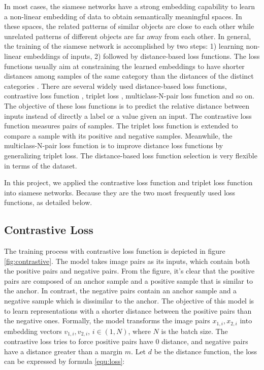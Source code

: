 In most cases, the siamese networks have a strong embedding capability to learn a non-linear embedding of data to obtain semantically meaningful spaces. In these spaces, the related patterns of similar objects are close to each other while unrelated patterns of different objects are far away from each other. In general, the training of the siamese network is accomplished by two steps: 1) learning non-linear embeddings of inputs, 2) followed by distance-based loss functions. The loss functions usually aim at constraining the learned embeddings to have shorter distances among samples of the same category than the distances of the distinct categories \cite{medela2019constellation}. There are several widely used distance-based loss functions, contrastive loss function \cite{sohn2016improved}, triplet loss \cite{schroff2015facenet}, multiclass-N-pair loss function \cite{chopra2005learning} and so on. The objective of these loss functions is to predict the relative distance between inputs instead of directly a label or a value given an input. The contrastive loss function measures pairs of samples. The triplet loss function is extended to compare a sample with its positive and negative samples. Meanwhile, the multiclass-N-pair loss function is to improve distance loss functions by generalizing triplet loss. The distance-based loss function selection is very flexible in terms of the dataset. 

In this project, we applied the contrastive loss function and triplet loss function into siamese networks. Because they are the two most frequently used loss functions, as detailed below. 

\subsection{Contrastive Loss}
The training process with contrastive loss function is depicted in figure \ref{fig:contrastive}. The model takes image pairs as its inputs, which contain both the positive pairs and negative pairs. From the figure, it's clear that the positive pairs are composed of an anchor sample and a positive sample that is similar to the anchor. In contrast, the negative pairs contain an anchor sample and a negative sample which is dissimilar to the anchor. The objective of this model is to learn representations with a shorter distance between the positive pairs than the negative ones. Formally, the model transforms the image pairs $x_{1,i}, x_{2,i}$ into embedding vectors $v_{1,i}, v_{2,i}$, $i \in (1, N)$, where $N$ is the batch size. The contrastive loss tries to force positive pairs have 0 distance, and negative pairs have a distance greater than a margin $m$. Let $d$ be the distance function, the loss can be expressed by formula \ref{equ:loss}: 

